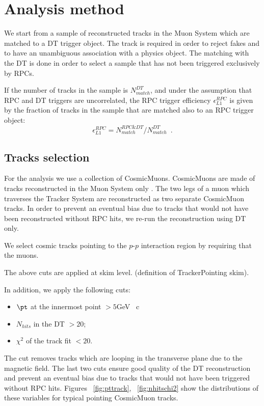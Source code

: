 \section{Analysis method}
We start from a sample of reconstructed tracks 
in the Muon System which are matched to a DT 
trigger object. 
The track is required in order to reject fakes 
and to have an unambiguous association with a physics object.
The matching with the DT is done in order to select a sample 
that has not been triggered exclusively by RPCs.

If the number of tracks in the sample is 
$N_{match}^{DT}$, and under the assumption
that RPC and DT triggers are uncorrelated,
the RPC trigger efficiency 
$\epsilon_{L1}^{RPC}$ is given by the fraction 
of tracks in the sample that are matched also 
to an RPC trigger object:
\begin{equation}
\epsilon_{L1}^{RPC} = N_{match}^{RPC\&DT}/N_{match}^{DT} \,\,\,.
\end{equation}

\subsection{Tracks selection}
For the analysis we use a collection of CosmicMuons.
CosmicMuons are made of tracks reconstructed in the
Muon System only .
The two legs of a muon which traverses
the Tracker System are reconstructed as two separate 
CosmicMuon tracks.
In order to prevent an eventual bias due to tracks 
that would not have been reconstructed without
RPC hits, we re-run the reconstruction using DT only.

We select cosmic tracks pointing to the $p$-$p$ interaction
region by requiring that the muons.
 
The above cuts are applied at skim level.
(definition of TrackerPointing skim).

In addition, we apply the following 
cuts:
\begin{itemize}
\item
$\pt$ at the innermost point $ > 5$GeV \ c 
\item
$N_{hits}$ in the DT $ > 20 $;
\item
$\chi^2$ of the track fit $ < 20 $.
\end{itemize}
The \pt cut removes tracks which are
looping in the transverse plane due 
to the magnetic field.%
The last two cuts ensure good quality
of the DT reconstruction and 
prevent an eventual bias due to 
tracks that would not have been triggered 
without RPC hits.
Figures ~\ref{fig:pttrack}, ~\ref{fig:nhitschi2} show the distributions
of these variables for typical pointing
CosmicMuon tracks.


